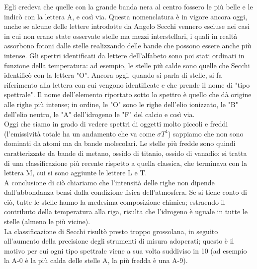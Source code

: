 \documentclass[a4paper,11pt]{article}
\begin{document}
    Egli credeva che quelle con la grande banda nera al centro fossero le più belle e le indicò con la lettera A, e così via. Questa nomenclatura è in vigore ancora oggi, anche se alcune delle lettere introdotte da Angelo Secchi vennero escluse nei casi in cui non erano state osservate stelle ma mezzi interstellari, i quali in realtà assorbono fotoni dalle stelle realizzando delle bande che possono essere anche più intense. Gli spettri identificati da lettere dell'alfabeto sono poi stati ordinati in funzione della temperatura: ad esempio, le stelle più calde sono quelle che Secchi identificò con la lettera "O". Ancora oggi, quando si parla di stelle, si fa riferimento alla lettera con cui vengono identificate e che prende il nome di "tipo spettrale". Il nome dell'elemento riportato sotto lo spettro è quello che dà origine alle righe più intense; in ordine, le "O" sono le righe dell'elio ionizzato, le "B" dell'elio neutro, le "A" dell'idrogeno  le "F" del calcio e così via.\\ Oggi che siamo in grado di vedere spettri di oggetti molto piccoli e freddi (l'emissività totale ha un andamento che va come ${\sigma}T^4$) sappiamo che non sono dominati da atomi ma da bande molecolari. Le stelle più fredde sono quindi caratterizzate da bande di metano, ossido di titanio, ossido di vanadio: si tratta di una classificazione più recente rispetto a quella classica, che terminava con la lettera M, cui si sono aggiunte le lettere L e T.\\ A conclusione di ciò chiariamo che l'intensità delle righe non dipende dall'abbondanza bensì dalla condizione fisica dell'atmosfera. Se si tiene conto di ciò, tutte le stelle hanno la medesima composizione chimica; estraendo il contributo della temperatura alla riga, risulta che l'idrogeno è uguale in tutte le stelle (almeno le più vicine).\\La classificazione di Secchi risultò presto troppo grossolana, in seguito all'aumento della precisione degli strumenti di misura adoperati; questo è il motivo per cui ogni tipo spettrale viene a sua volta suddiviso in 10 (ad esempio la A-0 è la più calda delle stelle A, la più fredda è una A-9).
\end{document}
